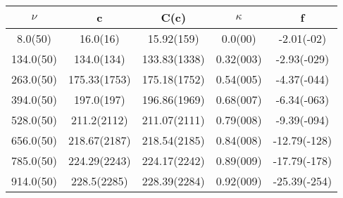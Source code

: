 \begin{table}[H]
	\centering
	\begin{tabular}{ccccc}
		$\nu$ & c & C(c) & $\kappa$ & f\\
		\hline
		8.0(50) & 16.0(16) & 15.92(159) & 0.0(00) & -2.01(-02)	\\
		134.0(50) & 134.0(134) & 133.83(1338) & 0.32(003) & -2.93(-029)	\\
		263.0(50) & 175.33(1753) & 175.18(1752) & 0.54(005) & -4.37(-044)	\\
		394.0(50) & 197.0(197) & 196.86(1969) & 0.68(007) & -6.34(-063)	\\
		528.0(50) & 211.2(2112) & 211.07(2111) & 0.79(008) & -9.39(-094)	\\
		656.0(50) & 218.67(2187) & 218.54(2185) & 0.84(008) & -12.79(-128)	\\
		785.0(50) & 224.29(2243) & 224.17(2242) & 0.89(009) & -17.79(-178)	\\
		914.0(50) & 228.5(2285) & 228.39(2284) & 0.92(009) & -25.39(-254)	\\
	\end{tabular}
\end{table}